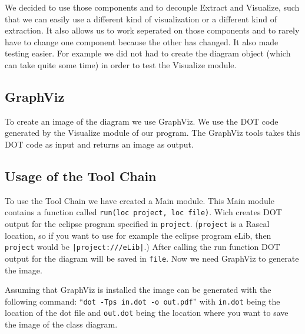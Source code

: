 \documentclass[a4paper,11pt]{article}
\begin{document}
	We decided to use those components and to decouple Extract and Visualize, such that we can easily use a different kind of visualization or a different kind of extraction.
	It also allows us to work seperated on those components and to rarely have to change one component because the other has changed.
	It also made testing easier. For example we did not had to create the diagram object (which can take quite some time) in order to test the Visualize module.
	
	\subsection{GraphViz}
	
	To create an image of the diagram we use GraphViz.
	We use the DOT code generated by the Visualize module of our program.
	The GraphViz tools takes this DOT code as input and returns an image as output.
	
	\subsection{Usage of the Tool Chain}
	To use the Tool Chain we have created a Main module.
	This Main module contains a function called \texttt{run(loc project, loc file)}.
	Wich creates DOT output for the eclipse program specified in \texttt{project}.
	(\texttt{project} is a Rascal location, so if you want to use for example the eclipse program eLib, then
	\texttt{project} would be \texttt{|project:///eLib|}.)
	After calling the run function DOT output for the diagram will be saved in \texttt{file}.
	Now we need GraphViz to generate the image.
	
	Assuming that GraphViz is installed the image can be generated with the following command:
	``\texttt{dot -Tps in.dot -o out.pdf}'' with \texttt{in.dot} being the location of the dot file and \texttt{out.dot}
	being the location where you want to save the image of the class diagram.
	
	
	
\end{document}
